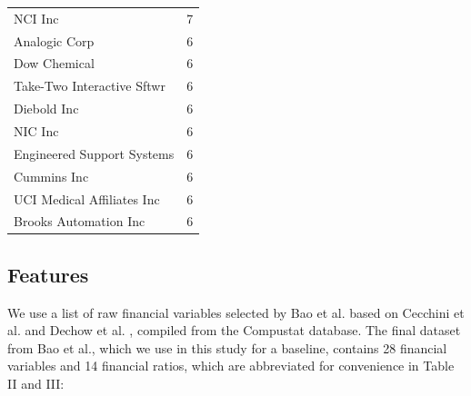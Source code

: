 \documentclass[conference]{IEEEtran}
\begin{document}
\begin{table}[H]
\begin{tabular}{@{}p{6.3cm}p{2.1cm}@{}}
\hspace{5mm}NCI Inc & 7\hspace{5mm} \\
\hspace{5mm}Analogic Corp & 6\hspace{5mm} \\
\hspace{5mm}Dow Chemical & 6\hspace{5mm} \\
\hspace{5mm}Take-Two Interactive Sftwr & 6\hspace{5mm} \\
\hspace{5mm}Diebold Inc & 6\hspace{5mm} \\
\hspace{5mm}NIC Inc & 6\hspace{5mm} \\
\hspace{5mm}Engineered Support Systems & 6\hspace{5mm} \\
\hspace{5mm}Cummins Inc & 6\hspace{5mm} \\
\hspace{5mm}UCI Medical Affiliates Inc & 6\hspace{5mm} \\
\hspace{5mm}Brooks Automation Inc & 6\hspace{5mm} \\
\bottomrule
\end{tabular}
\label{tab1}
\end{table} \vspace{10pt}\subsection{Features}
We use a list of raw financial variables selected by Bao et al. \cite{b7} based on Cecchini et al. \cite{b1} and Dechow et al. \cite{b3}, compiled from the Compustat database. The final dataset from Bao et al., which we use in this study for a baseline, contains 28 financial variables and 14 financial ratios, which are abbreviated for convenience in Table II and III: \vspace{10pt}
\end{document}
